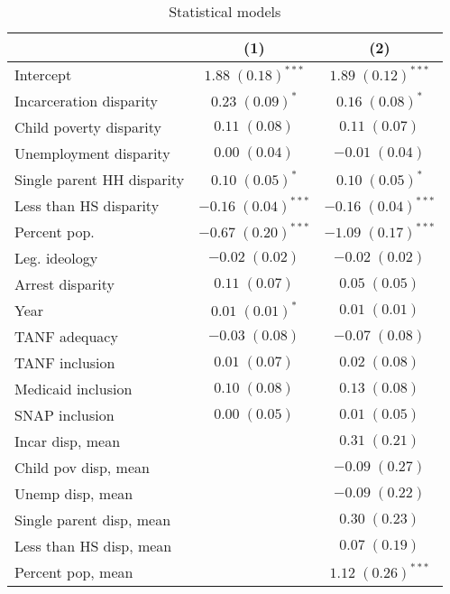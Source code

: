 
\begin{table}
\caption{Statistical models}
\begin{center}
\begin{tabular}{l c c }
\hline
 & (1) & (2) \\
\hline
Intercept                  & $1.88 \; (0.18)^{***}$  & $1.89 \; (0.12)^{***}$  \\
Incarceration disparity    & $0.23 \; (0.09)^{*}$    & $0.16 \; (0.08)^{*}$    \\
Child poverty disparity    & $0.11 \; (0.08)$        & $0.11 \; (0.07)$        \\
Unemployment disparity     & $0.00 \; (0.04)$        & $-0.01 \; (0.04)$       \\
Single parent HH disparity & $0.10 \; (0.05)^{*}$    & $0.10 \; (0.05)^{*}$    \\
Less than HS disparity     & $-0.16 \; (0.04)^{***}$ & $-0.16 \; (0.04)^{***}$ \\
Percent pop.               & $-0.67 \; (0.20)^{***}$ & $-1.09 \; (0.17)^{***}$ \\
Leg. ideology              & $-0.02 \; (0.02)$       & $-0.02 \; (0.02)$       \\
Arrest disparity           & $0.11 \; (0.07)$        & $0.05 \; (0.05)$        \\
Year                       & $0.01 \; (0.01)^{*}$    & $0.01 \; (0.01)$        \\
TANF adequacy              & $-0.03 \; (0.08)$       & $-0.07 \; (0.08)$       \\
TANF inclusion             & $0.01 \; (0.07)$        & $0.02 \; (0.08)$        \\
Medicaid inclusion         & $0.10 \; (0.08)$        & $0.13 \; (0.08)$        \\
SNAP inclusion             & $0.00 \; (0.05)$        & $0.01 \; (0.05)$        \\
Incar disp, mean           &                         & $0.31 \; (0.21)$        \\
Child pov disp, mean       &                         & $-0.09 \; (0.27)$       \\
Unemp disp, mean           &                         & $-0.09 \; (0.22)$       \\
Single parent disp, mean   &                         & $0.30 \; (0.23)$        \\
Less than HS disp, mean    &                         & $0.07 \; (0.19)$        \\
Percent pop, mean          &                         & $1.12 \; (0.26)^{***}$  \\

\end{tabular}
\end{center}
\end{table}
